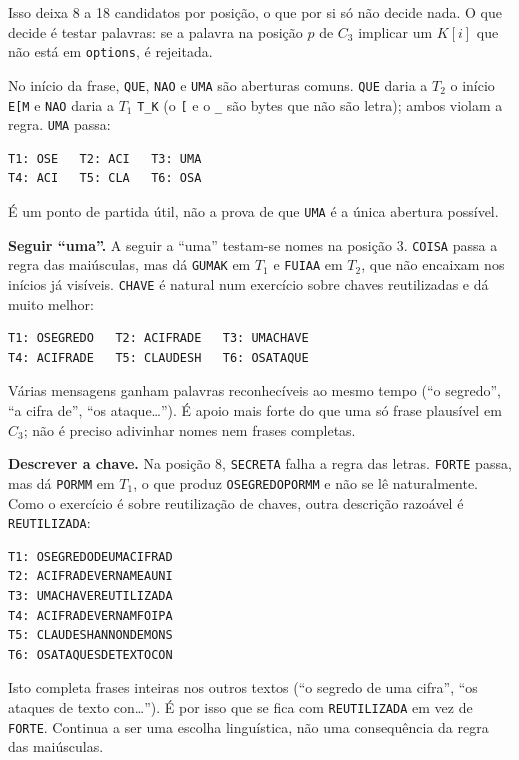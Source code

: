 \documentclass[11pt,a4paper]{article}
\begin{document}
Isso deixa 8 a 18 candidatos por posição, o que por si só não decide
nada. O que decide é testar palavras: se a palavra na posição $p$ de
$C_3$ implicar um $K[i]$ que não está em \texttt{options}, é rejeitada.

No início da frase, \texttt{QUE}, \texttt{NAO} e \texttt{UMA} são
aberturas comuns. \texttt{QUE} daria a $T_2$ o início \texttt{E[M} e
\texttt{NAO} daria a $T_1$ \texttt{T\_K} (o \texttt{[} e o \texttt{\_}
são bytes que não são letra); ambos violam a regra. \texttt{UMA} passa:

\begin{verbatim}
T1: OSE   T2: ACI   T3: UMA
T4: ACI   T5: CLA   T6: OSA
\end{verbatim}

É um ponto de partida útil, não a prova de que \texttt{UMA} é a única
abertura possível.

\textbf{Seguir ``uma''.} A seguir a ``uma'' testam-se nomes na posição 3.
\texttt{COISA} passa a regra das maiúsculas, mas dá \texttt{GUMAK} em
$T_1$ e \texttt{FUIAA} em $T_2$, que não encaixam nos inícios já
visíveis. \texttt{CHAVE} é natural num exercício sobre chaves
reutilizadas e dá muito melhor:

\begin{verbatim}
T1: OSEGREDO   T2: ACIFRADE   T3: UMACHAVE
T4: ACIFRADE   T5: CLAUDESH   T6: OSATAQUE
\end{verbatim}

Várias mensagens ganham palavras reconhecíveis ao mesmo tempo (``o
segredo'', ``a cifra de'', ``os ataque\ldots''). É apoio mais forte do
que uma só frase plausível em $C_3$; não é preciso adivinhar nomes nem
frases completas.

\textbf{Descrever a chave.} Na posição 8, \texttt{SECRETA} falha a regra
das letras. \texttt{FORTE} passa, mas dá \texttt{PORMM} em $T_1$, o que
produz \texttt{OSEGREDOPORMM} e não se lê naturalmente. Como o exercício
é sobre reutilização de chaves, outra descrição razoável é
\texttt{REUTILIZADA}:

\begin{verbatim}
T1: OSEGREDODEUMACIFRAD
T2: ACIFRADEVERNAMEAUNI
T3: UMACHAVEREUTILIZADA
T4: ACIFRADEVERNAMFOIPA
T5: CLAUDESHANNONDEMONS
T6: OSATAQUESDETEXTOCON
\end{verbatim}

Isto completa frases inteiras nos outros textos (``o segredo de uma
cifra'', ``os ataques de texto con\ldots''). É por isso que se fica com
\texttt{REUTILIZADA} em vez de \texttt{FORTE}. Continua a ser uma
escolha linguística, não uma consequência da regra das maiúsculas.
\end{document}
